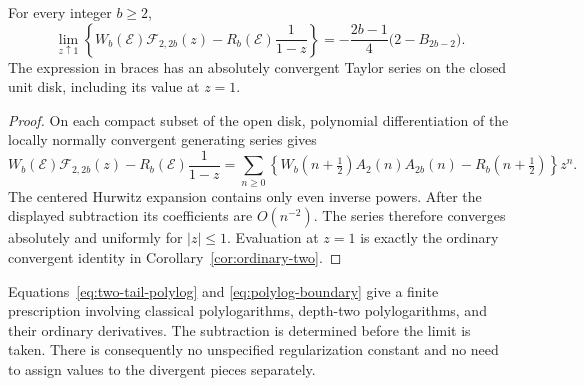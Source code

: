 \begin{theorem}
\label{thm:polylog-boundary}
For every integer $b\ge2$,
\begin{equation}\label{eq:polylog-boundary}
 \boxed{\displaystyle
 \lim_{z\uparrow1}\left\{
 W_b(\mathcal E)\mathcal F_{2,2b}(z)
       -R_b(\mathcal E)\frac{1}{1-z}\right\}
 =-\frac{2b-1}{4}\bigl(2-B_{2b-2}\bigr).}
\end{equation}
The expression in braces has an absolutely convergent Taylor series
on the closed unit disk, including its value at $z=1$.
\end{theorem}
\begin{proof}
On each compact subset of the open disk, polynomial differentiation
of the locally normally convergent generating series gives
\[
 W_b(\mathcal E)\mathcal F_{2,2b}(z)
       -R_b(\mathcal E)\frac{1}{1-z}
 =\sum_{n\ge0}\left\{
 W_b(n+\tfrac12)A_2(n)A_{2b}(n)-R_b(n+\tfrac12)
 \right\}z^n.
\]
The centered Hurwitz expansion contains only even inverse powers.
After the displayed subtraction its coefficients are $O(n^{-2})$.
The series therefore converges absolutely and uniformly for $|z|\le1$.
Evaluation at $z=1$ is exactly the ordinary convergent identity in
Corollary~\ref{cor:ordinary-two}.
\end{proof}

Equations~\eqref{eq:two-tail-polylog} and
\eqref{eq:polylog-boundary} give a finite prescription involving
classical polylogarithms, depth-two polylogarithms, and their ordinary
derivatives. The subtraction is determined before the limit is taken.
There is consequently no unspecified regularization constant and
no need to assign values to the divergent pieces separately.
